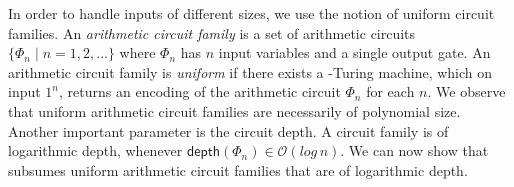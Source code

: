 
In order to handle inputs of different sizes, we use the notion of uniform circuit families. An \textit{arithmetic circuit family} is a set of arithmetic circuits $\{\Phi_n\mid n=1,2,\ldots\}$ where $\Phi_n$ has $n$ input variables and a single output gate. An arithmetic circuit family is \textit{uniform} if there exists a \logspace-Turing machine,
which on input $1^n$, returns an encoding of the arithmetic circuit $\Phi_n$ for each $n$.
We observe that uniform arithmetic circuit families are necessarily of polynomial size. %
Another important parameter is the circuit depth. A circuit family is of logarithmic depth, whenever $\mathsf{depth}(\Phi_n)\in \mathcal{O}(log\, n)$. We can now show that \langfor subsumes uniform arithmetic circuit families that are of logarithmic depth. 

